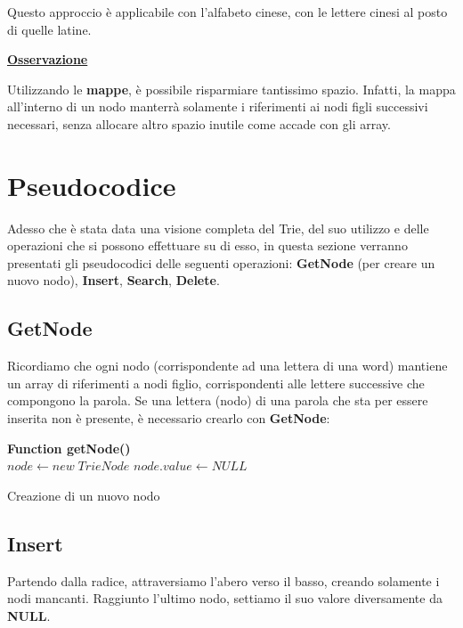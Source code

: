 \documentclass[a4paper, 12pt]{article}
\begin{document}
Questo approccio è applicabile con l'alfabeto cinese, con le lettere cinesi al posto di quelle latine.

\vspace{5mm}
\textbf{\underline{Osservazione}}

Utilizzando le \textbf{mappe}, è possibile risparmiare tantissimo spazio. Infatti, la mappa all'interno di un nodo manterrà solamente i riferimenti ai nodi figli successivi necessari, senza allocare altro spazio inutile come accade con gli array. 


\section{Pseudocodice}

Adesso che è stata data una visione completa del Trie, del suo utilizzo e delle operazioni che si possono effettuare su di esso, in questa sezione verranno presentati gli pseudocodici delle seguenti operazioni: \textbf{GetNode} (per creare un nuovo nodo), \textbf{Insert}, \textbf{Search}, \textbf{Delete}.

\subsection{GetNode}
Ricordiamo che ogni nodo (corrispondente ad una lettera di una word) mantiene un array di riferimenti a nodi figlio, corrispondenti alle lettere successive che compongono la parola. Se una lettera (nodo) di una parola che sta per essere inserita non è presente, è necessario crearlo con \textbf{GetNode}:

\vspace{5mm}
\begin{algorithm}[H]
\SetAlgoLined
  \textbf{Function getNode()}\\
  $node \leftarrow new\;TrieNode$\;
  $node.value \leftarrow NULL$\;
  \;
\caption{Creazione di un nuovo nodo}
\end{algorithm}

\clearpage

\subsection{Insert}
Partendo dalla radice, attraversiamo l'abero verso il basso, creando solamente i nodi mancanti. Raggiunto l'ultimo nodo, settiamo il suo valore diversamente da \textbf{NULL}.
\end{document}
